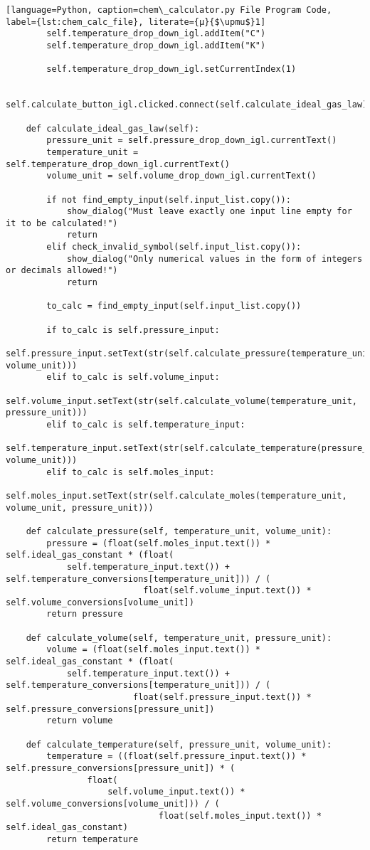 \begin{lstlisting}[language=Python, caption=chem\_calculator.py File Program Code, label={lst:chem_calc_file}, literate={μ}{$\upmu$}1]
        self.temperature_drop_down_igl.addItem("C")
        self.temperature_drop_down_igl.addItem("K")

        self.temperature_drop_down_igl.setCurrentIndex(1)

        self.calculate_button_igl.clicked.connect(self.calculate_ideal_gas_law)

    def calculate_ideal_gas_law(self):
        pressure_unit = self.pressure_drop_down_igl.currentText()
        temperature_unit = self.temperature_drop_down_igl.currentText()
        volume_unit = self.volume_drop_down_igl.currentText()

        if not find_empty_input(self.input_list.copy()):
            show_dialog("Must leave exactly one input line empty for it to be calculated!")
            return
        elif check_invalid_symbol(self.input_list.copy()):
            show_dialog("Only numerical values in the form of integers or decimals allowed!")
            return

        to_calc = find_empty_input(self.input_list.copy())

        if to_calc is self.pressure_input:
            self.pressure_input.setText(str(self.calculate_pressure(temperature_unit, volume_unit)))
        elif to_calc is self.volume_input:
            self.volume_input.setText(str(self.calculate_volume(temperature_unit, pressure_unit)))
        elif to_calc is self.temperature_input:
            self.temperature_input.setText(str(self.calculate_temperature(pressure_unit, volume_unit)))
        elif to_calc is self.moles_input:
            self.moles_input.setText(str(self.calculate_moles(temperature_unit, volume_unit, pressure_unit)))

    def calculate_pressure(self, temperature_unit, volume_unit):
        pressure = (float(self.moles_input.text()) * self.ideal_gas_constant * (float(
            self.temperature_input.text()) + self.temperature_conversions[temperature_unit])) / (
                           float(self.volume_input.text()) * self.volume_conversions[volume_unit])
        return pressure

    def calculate_volume(self, temperature_unit, pressure_unit):
        volume = (float(self.moles_input.text()) * self.ideal_gas_constant * (float(
            self.temperature_input.text()) + self.temperature_conversions[temperature_unit])) / (
                         float(self.pressure_input.text()) * self.pressure_conversions[pressure_unit])
        return volume

    def calculate_temperature(self, pressure_unit, volume_unit):
        temperature = ((float(self.pressure_input.text()) * self.pressure_conversions[pressure_unit]) * (
                float(
                    self.volume_input.text()) * self.volume_conversions[volume_unit])) / (
                              float(self.moles_input.text()) * self.ideal_gas_constant)
        return temperature


\end{lstlisting}
